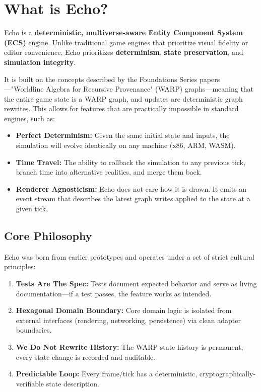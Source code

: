 \section{What is Echo?}

Echo is a \textbf{deterministic, multiverse-aware Entity Component System (ECS)} engine. Unlike traditional game engines that prioritize visual fidelity or editor convenience, Echo prioritizes \textbf{determinism}, \textbf{state preservation}, and \textbf{simulation integrity}.

It is built on the concepts described by the \AION{} Foundations Series papers---"Worldline Algebra for Recursive Provenance" (WARP) graphs---meaning that the entire game state is a WARP graph, and updates are deterministic graph rewrites. This allows for features that are practically impossible in standard engines, such as:

\begin{itemize}
    \item \textbf{Perfect Determinism:} Given the same initial state and inputs, the simulation will evolve identically on any machine (x86, ARM, WASM).
    \item \textbf{Time Travel:} The ability to rollback the simulation to any previous tick, branch time into alternative realities, and merge them back.
    \item \textbf{Renderer Agnosticism:} Echo does not care how it is drawn. It emits an event stream that describes the latest graph writes applied to the \WARP{} state at a given tick.
\end{itemize}

\subsection{Core Philosophy}

Echo was born from earlier prototypes and operates under a set of strict cultural principles:

\begin{enumerate}
    \item \textbf{Tests Are The Spec:} Tests document expected behavior and serve as living documentation---if a test passes, the feature works as intended.
    \item \textbf{Hexagonal Domain Boundary:} Core domain logic is isolated from external interfaces (rendering, networking, persistence) via clean adapter boundaries.
    \item \textbf{We Do Not Rewrite History:} The WARP state history is permanent; every state change is recorded and auditable.
    \item \textbf{Predictable Loop:} Every frame/tick has a deterministic, cryptographically-verifiable state description.
\end{enumerate}

